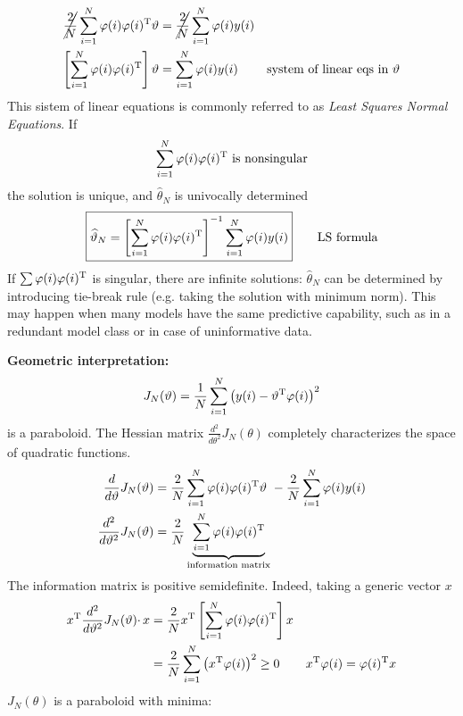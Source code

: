 \begin{align*}
\cancel{\frac{2}{N}}\sum _{i=1}^{N} \varphi (i) \varphi (i)^{\mathrm{T}} \vartheta  & =\cancel{\frac{2}{N}}\sum _{i=1}^{N} \varphi (i) y(i) & \\
\left[\sum _{i=1}^{N} \varphi (i) \varphi (i)^{\mathrm{T}}\right] \vartheta  & =\sum _{i=1}^{N} \varphi (i) y(i) & \text{system of linear eqs in} \ \vartheta 
\end{align*}
This sistem of linear equations is commonly referred to as \textit{Least Squares Normal Equations}. If 
\begin{equation*}
\sum _{i=1}^{N} \varphi (i) \varphi (i)^{\mathrm{T}} \ \text{is nonsingular}
\end{equation*}
the solution is unique, and $ \hat{\theta }_{N}$ is univocally determined
\begin{equation*}
\boxed{\widehat{\vartheta }_{N} =\left[\sum _{i=1}^{N} \varphi (i) \varphi (i)^{\mathrm{T}}\right]^{-1}\sum _{i=1}^{N} \varphi (i) y(i)}
\qquad \text{LS formula}
\end{equation*}
If $ \sum \varphi (i) \varphi (i)^{\mathrm{T}}$ is singular, there are infinite solutions: $ \hat{\theta }_{N}$ can be determined by introducing tie-break rule (e.g. taking the solution with minimum norm). This may happen when many models have the same predictive capability, such as in a redundant model class or in case of uninformative data.

\textbf{Geometric interpretation:}
\begin{equation*}
J_{N}(\vartheta) =\frac{1}{N}\sum _{i=1}^{N}\left(y(i) -\vartheta ^{\mathrm{T}} \varphi (i)\right)^{2}
\end{equation*}
is a paraboloid. The Hessian matrix $ \frac{d^{2}}{d\theta ^{2}} J_{N}(\theta)$ completely characterizes the space of quadratic functions.
\begin{align*}
\frac{d}{d\vartheta } J_{N}(\vartheta) & =\frac{2}{N}\sum _{i=1}^{N} \varphi (i) \varphi (i)^{\mathrm{T}} \vartheta \ -\frac{2}{N}\sum _{i=1}^{N} \varphi (i) y(i)\\
\frac{d^{2}}{d\vartheta ^{2}} J_{N}(\vartheta) & =\frac{2}{N}\underbrace{\sum _{i=1}^{N} \varphi (i) \varphi (i)^{\mathrm{T}}}_{\text{information matrix}}
\end{align*}
The information matrix is positive semidefinite. Indeed, taking a generic vector $x$
\begin{align*}
x^{\mathrm{T}}\frac{d^{2}}{d\vartheta ^{2}} J_{N}(\vartheta) \cdotp x & =\frac{2}{N} x^{\mathrm{T}}\left[\sum _{i=1}^{N} \varphi (i) \varphi (i)^{\mathrm{T}}\right] x & \\
 & =\frac{2}{N}\sum _{i=1}^{N}\left(x^{\mathrm{T}} \varphi (i)\right)^{2} \geq 0 & x^{\mathrm{T}} \varphi (i) =\varphi (i)^{\mathrm{T}} x
\end{align*}
$ J_{N}(\theta)$ is a paraboloid with minima:

